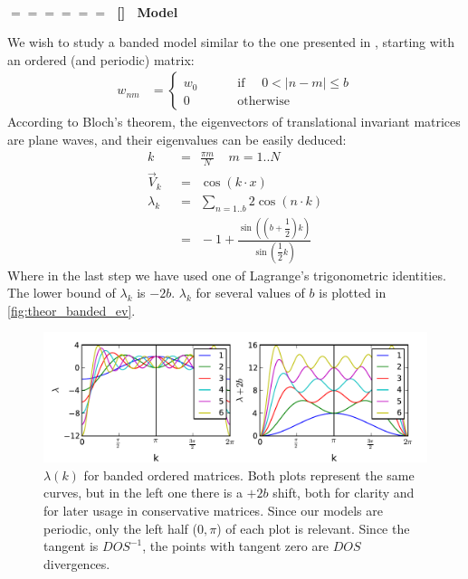 \documentclass[onecolumn,fleqn,longbibliography]{revtex4}
\newcommand{\sect}[1]
{
\addtocounter{section}{1} 
\setcounter{subsection}{0}
\ \\ 
\pdfbookmark[2]{\thesection. \ #1}{sect.\thesection}
{\Large\bf $=\!=\!=\!=\!=\!=\;$ [\thesection] \ #1}  
\nopagebreak
}
\begin{document}
\sect{Model}

We wish to study a banded model similar to the one presented in \cite{bodyfelt_scaling_2013},
starting with an ordered (and periodic) matrix:
%
\begin{align}\label{eq:ordered}
w_{nm} &= \begin{cases}
  w_0 &\qquad \textrm{ if  } \quad 0<|n-m|\le b \\
  0 &\qquad \textrm{ otherwise}
\end{cases}
\end{align}
%
According to Bloch's theorem, the eigenvectors of translational invariant
matrices are plane waves, and their eigenvalues can be easily deduced:
\begin{align}
k\ \  &=\ \  \frac{\pi m}{N} \ \ \ \ \ m=1..N \\
\vec{V}_k\ \  &=\ \  \cos(k\cdot x)\\
\lambda_k\ \  &=\ \  \sum_{n=1..b} 2\cos(n\cdot k) \\
&= \ \ -1 + \frac{\sin((b+\dfrac{1}{2})k)}{\sin(\dfrac{1}{2}k)}
\end{align}  
Where in the last step we have used one of Lagrange's trigonometric identities. 
The lower bound of $\lambda_k$ is $-2b$. 
$\lambda_k$ for several values of $b$ is plotted in \autoref{fig:theor_banded_ev}.

\begin{figure}[H]
    \includegraphics{pta_theor_banded_ev}
    \caption{$\lambda(k)$ for banded ordered matrices. Both plots
    represent the same curves, but in the left one there is a $+2b$ shift, both for clarity 
    and for later usage in conservative matrices. Since our 
    models are periodic, only the left half ($0,\pi$) of each plot is relevant. Since 
    the tangent is $DOS^{-1}$, the points with tangent zero are $DOS$ divergences.
    }
    \label{fig:theor_banded_ev}
\end{figure}
\end{document}
